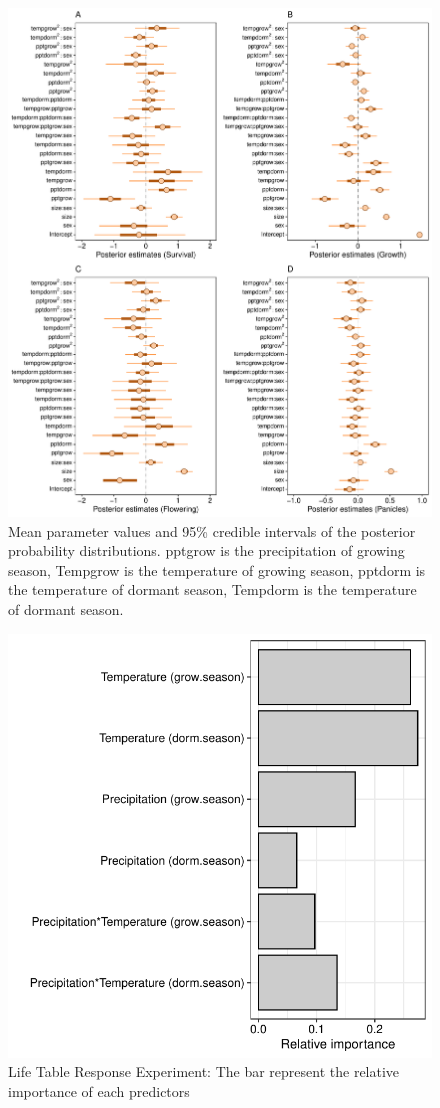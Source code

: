 \documentclass[12pt]{article}
\begin{document}
	

\begin{figure}[H]
		\centering
		\includegraphics[width=0.99\linewidth]{Figures/Posterior_mean.pdf}
		\caption{Mean parameter values and 95\% credible intervals of the posterior probability distributions. 
		pptgrow is  the precipitation of growing season,
		Tempgrow is the temperature of growing season,
		pptdorm is the temperature of dormant season,
		Tempdorm is the temperature of dormant season.}
		\label{Sup:Posterior}
\end{figure}


\begin{figure}[H]
  \begin{center}
    \includegraphics[width=0.65\linewidth]{Figures/Fig_LTRE.pdf}
  \caption{Life Table Response Experiment: The bar represent the relative importance of each predictors}
  \label{Sup:LTRE}
  \end{center}
\end{figure}
\end{document}
